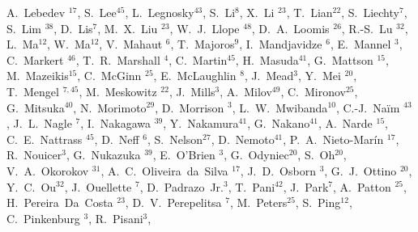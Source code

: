 \documentclass[type=preprint,linenumbering=off]{sphenix}
\begin{document}
\begin{flushleft}
A.~Lebedev\,\,$^{17}$,
S.~Lee$^{45}$,
L.~Legnosky$^{43}$,
S.~Li$^{8}$,
X.~Li\,\,$^{23}$,
T.~Lian$^{22}$,
S.~Liechty$^{7}$,
S.~Lim\,\,$^{38}$,
D.~Lis$^{7}$,
M.~X.~Liu\,\,$^{23}$,
W.~J.~Llope\,\,$^{48}$,
D.~A.~Loomis\,\,$^{26}$,
R.-S.~Lu\,\,$^{32}$,
L.~Ma$^{12}$,
W.~Ma$^{12}$,
V.~Mahaut\,\,$^{6}$,
T.~Majoros$^{9}$,
I.~Mandjavidze\,\,$^{6}$,
E.~Mannel\,\,$^{3}$,
C.~Markert\,\,$^{46}$,
T.~R.~Marshall\,\,$^{4}$,
C.~Martin$^{45}$,
H.~Masuda$^{41}$,
G.~Mattson\,\,$^{15}$,
M.~Mazeikis$^{15}$,
C.~McGinn\,\,$^{25}$,
E.~McLaughlin\,\,$^{8}$,
J.~Mead$^{3}$,
Y.~Mei\,\,$^{20}$,
T.~Mengel\,\,$^{7,45}$,
M.~Meskowitz\,\,$^{22}$,
J.~Mills$^{3}$,
A.~Milov$^{49}$,
C.~Mironov$^{25}$,
G.~Mitsuka$^{40}$,
N.~Morimoto$^{29}$,
D.~Morrison\,\,$^{3}$,
L.~W.~Mwibanda$^{10}$,
C.-J.~Na\"{i}m\,\,$^{43}$,
J.~L.~Nagle\,\,$^{7}$,
I.~Nakagawa\,\,$^{39}$,
Y.~Nakamura$^{41}$,
G.~Nakano$^{41}$,
A.~Narde\,\,$^{15}$,
C.~E.~Nattrass\,\,$^{45}$,
D.~Neff\,\,$^{6}$,
S.~Nelson$^{27}$,
D.~Nemoto$^{41}$,
P.~A.~Nieto-Mar\'{i}n\,\,$^{17}$,
R.~Nouicer$^{3}$,
G.~Nukazuka\,\,$^{39}$,
E.~O'Brien\,\,$^{3}$,
G.~Odyniec$^{20}$,
S.~Oh$^{20}$,
V.~A.~Okorokov\,\,$^{31}$,
A.~C.~Oliveira~da~Silva\,\,$^{17}$,
J.~D.~Osborn\,\,$^{3}$,
G.~J.~Ottino\,\,$^{20}$,
Y.~C.~Ou$^{32}$,
J.~Ouellette\,\,$^{7}$,
D.~Padrazo~Jr.$^{3}$,
T.~Pani$^{42}$,
J.~Park$^{7}$,
A.~Patton\,\,$^{25}$,
H.~Pereira~Da~Costa\,\,$^{23}$,
D.~V.~Perepelitsa\,\,$^{7}$,
M.~Peters$^{25}$,
S.~Ping$^{12}$,
C.~Pinkenburg\,\,$^{3}$,
R.~Pisani$^{3}$,

\end{flushleft}
\end{document}
